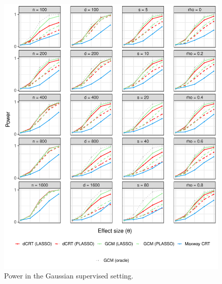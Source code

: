 \documentclass[12pt]{article}
\theoremstyle{definition}
\theoremstyle{remark}
\begin{document}
\begin{figure}[!ht]
	\centering
	\includegraphics[scale = 1]{figures/gaussian_supervised_setting_alternative.pdf}
	\caption{Power in the Gaussian supervised setting.}
	\label{fig:gaussian_supervised_alternative}
\end{figure}
\end{document}
